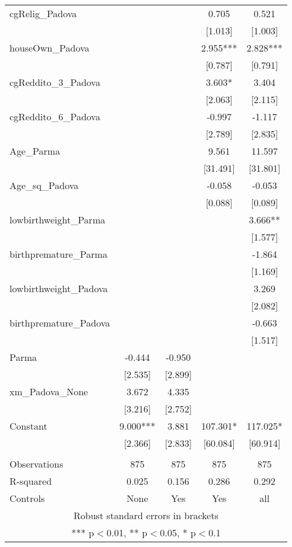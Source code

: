 \documentclass[]{article}
\begin{document}
\begin{tabular}{lcccc}
cgRelig\_Padova &  &  & 0.705 & 0.521 \\
 &  &  & [1.013] & [1.003] \\
houseOwn\_Padova &  &  & 2.955*** & 2.828*** \\
 &  &  & [0.787] & [0.791] \\
cgReddito\_3\_Padova &  &  & 3.603* & 3.404 \\
 &  &  & [2.063] & [2.115] \\
cgReddito\_6\_Padova &  &  & -0.997 & -1.117 \\
 &  &  & [2.789] & [2.835] \\
Age\_Parma &  &  & 9.561 & 11.597 \\
 &  &  & [31.491] & [31.801] \\
Age\_sq\_Padova &  &  & -0.058 & -0.053 \\
 &  &  & [0.088] & [0.089] \\
lowbirthweight\_Parma &  &  &  & 3.666** \\
 &  &  &  & [1.577] \\
birthpremature\_Parma &  &  &  & -1.864 \\
 &  &  &  & [1.169] \\
lowbirthweight\_Padova &  &  &  & 3.269 \\
 &  &  &  & [2.082] \\
birthpremature\_Padova &  &  &  & -0.663 \\
 &  &  &  & [1.517] \\
Parma & -0.444 & -0.950 &  &  \\
 & [2.535] & [2.899] &  &  \\
xm\_Padova\_None & 3.672 & 4.335 &  &  \\
 & [3.216] & [2.752] &  &  \\
Constant & 9.000*** & 3.881 & 107.301* & 117.025* \\
 & [2.366] & [2.833] & [60.084] & [60.914] \\
 &  &  &  &  \\
Observations & 875 & 875 & 875 & 875 \\
R-squared & 0.025 & 0.156 & 0.286 & 0.292 \\
 Controls & None & Yes & Yes & all \\ \hline
\multicolumn{5}{c}{ Robust standard errors in brackets} \\
\multicolumn{5}{c}{ *** p$<$0.01, ** p$<$0.05, * p$<$0.1} \\
\end{tabular}
\end{document}
